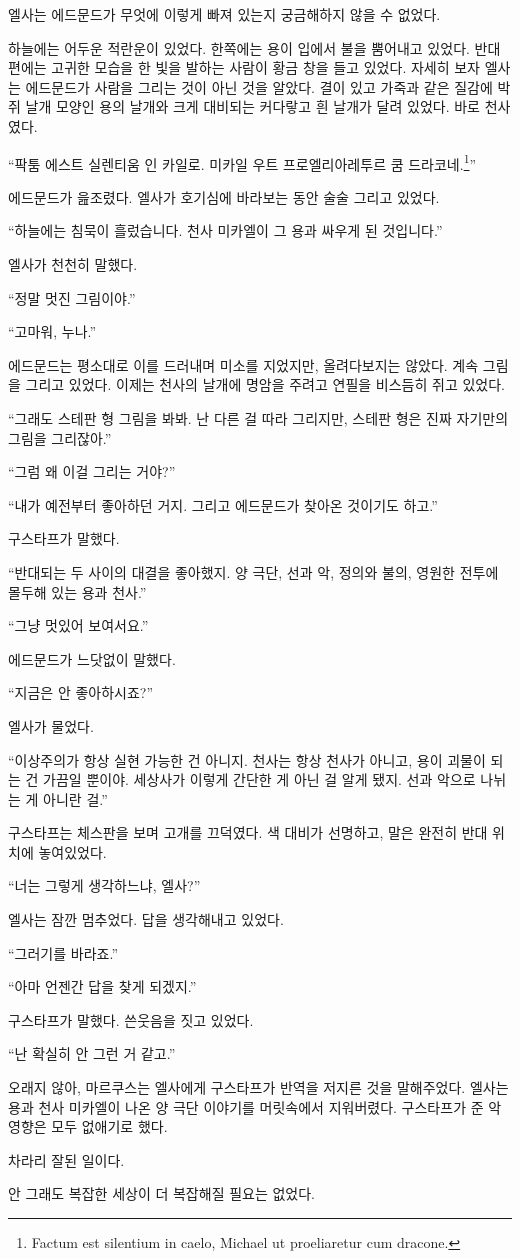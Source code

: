 엘사는 에드문드가 무엇에 이렇게 빠져 있는지 궁금해하지 않을 수 없었다.

하늘에는 어두운 적란운이 있었다. 한쪽에는 용이 입에서 불을 뿜어내고 있었다. 반대편에는 고귀한 모습을 한 빛을 발하는 사람이 황금 창을 들고 있었다. 자세히 보자 엘사는 에드문드가 사람을 그리는 것이 아닌 것을 알았다. 결이 있고 가죽과 같은 질감에 박쥐 날개 모양인 용의 날개와 크게 대비되는 커다랗고 흰 날개가 달려 있었다. 바로 천사였다.

``팍툼 에스트 실렌티움 인 카일로. 미카일 우트 프로엘리아레투르 쿰 드라코네.\footnote{Factum est silentium in caelo, Michael ut proeliaretur cum dracone.}''

에드문드가 읊조렸다. 엘사가 호기심에 바라보는 동안 술술 그리고 있었다.

``하늘에는 침묵이 흘렀습니다. 천사 미카엘이 그 용과 싸우게 된 것입니다.''

엘사가 천천히 말했다.

``정말 멋진 그림이야.''

``고마워, 누나.''

에드문드는 평소대로 이를 드러내며 미소를 지었지만, 올려다보지는 않았다. 계속 그림을 그리고 있었다. 이제는 천사의 날개에 명암을 주려고 연필을 비스듬히 쥐고 있었다.

``그래도 스테판 형 그림을 봐봐. 난 다른 걸 따라 그리지만, 스테판 형은 진짜 자기만의 그림을 그리잖아.''

``그럼 왜 이걸 그리는 거야?''

``내가 예전부터 좋아하던 거지. 그리고 에드문드가 찾아온 것이기도 하고.''

구스타프가 말했다.

``반대되는 두 사이의 대결을 좋아했지. 양 극단, 선과 악, 정의와 불의, 영원한 전투에 몰두해 있는 용과 천사.''

``그냥 멋있어 보여서요.''

에드문드가 느닷없이 말했다.

``지금은 안 좋아하시죠?''

엘사가 물었다.

``이상주의가 항상 실현 가능한 건 아니지. 천사는 항상 천사가 아니고, 용이 괴물이 되는 건 가끔일 뿐이야. 세상사가 이렇게 간단한 게 아닌 걸 알게 됐지. 선과 악으로 나뉘는 게 아니란 걸.''

구스타프는 체스판을 보며 고개를 끄덕였다. 색 대비가 선명하고, 말은 완전히 반대 위치에 놓여있었다.

``너는 그렇게 생각하느냐, 엘사?''

엘사는 잠깐 멈추었다. 답을 생각해내고 있었다.

``그러기를 바라죠.''

``아마 언젠간 답을 찾게 되겠지.''

구스타프가 말했다. 쓴웃음을 짓고 있었다.

``난 확실히 안 그런 거 같고.''

\textbreak

오래지 않아, 마르쿠스는 엘사에게 구스타프가 반역을 저지른 것을 말해주었다. 엘사는 용과 천사 미카엘이 나온 양 극단 이야기를 머릿속에서 지워버렸다. 구스타프가 준 악영향은 모두 없애기로 했다.

차라리 잘된 일이다.

안 그래도 복잡한 세상이 더 복잡해질 필요는 없었다.

